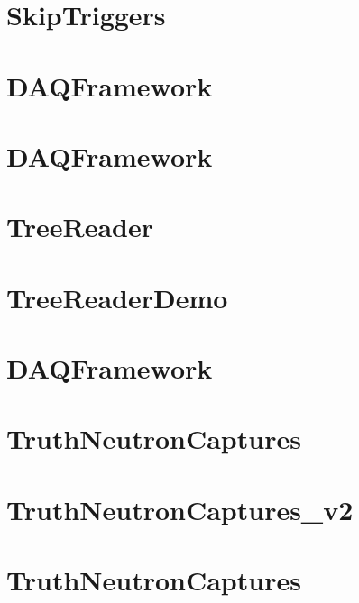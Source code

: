\let\mypdfximage\pdfximage\def\pdfximage{\immediate\mypdfximage}\documentclass[twoside]{book}
\newcommand{\+}{\discretionary{\mbox{\scriptsize$\hookleftarrow$}}{}{}}
\begin{document}
\chapter{Skip\+Triggers}
\label{md_UserTools_SkipTriggers_README}

\chapter{DAQFramework}
\label{md_UserTools_template_README}

\chapter{DAQFramework}
\label{md_UserTools_TestTool_README}

\chapter{Tree\+Reader}
\label{md_UserTools_TreeReader_README}

\chapter{Tree\+Reader\+Demo}
\label{md_UserTools_TreeReaderDemo_README}

\chapter{DAQFramework}
\label{md_UserTools_TrueNCaptures_README}

\chapter{Truth\+Neutron\+Captures}
\label{md_UserTools_TruthNeutronCaptures_README}

\chapter{Truth\+Neutron\+Captures\+\_\+v2}
\label{md_UserTools_TruthNeutronCaptures_v2_README}

\chapter{Truth\+Neutron\+Captures}
\label{md_UserTools_TruthNeutronCaptures_v3_README}

\end{document}

